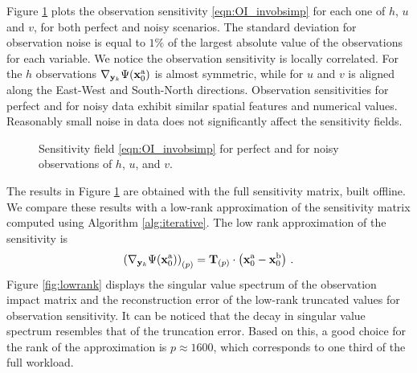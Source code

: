 \documentclass[final,sort&compress]{elsarticle}
\newcommand{\T}{\mathbf{T}}
\newcommand{\xb}{ \mathbf{x}^{\rm b} }
\newcommand{\xa}{ \mathbf{x}^{\rm a} }
\newcommand{\y}{ \mathbf{y} }
\begin{document}
Figure \ref{fig:OI_perfvspert} plots the observation sensitivity \eqref{eqn:OI_invobsimp} for each one of $h$, $u$ and $v$, for both perfect and noisy scenarios.
The standard deviation for observation noise is equal to $1\%$ of the largest absolute value of the observations for each variable. 
We notice the observation sensitivity is locally correlated. 
For the $h$ observations $\nabla_{\y_k} \Psi(\xa_0)$ is almost symmetric, while for $u$ and $v$ is aligned along the East-West and South-North directions. 
Observation sensitivities for perfect and for noisy data exhibit similar spatial features and numerical values.
Reasonably small noise in data does not significantly affect the sensitivity fields.

\begin{figure}
\setcounter{subfigure}{0}
\centering
\caption{Sensitivity field \eqref{eqn:OI_invobsimp} for perfect and for noisy observations of $h$, $u$, and $v$.}
 \label{fig:OI_perfvspert}
\end{figure}

The results in Figure \ref{fig:OI_perfvspert} are obtained with the full sensitivity matrix, built offline.
We compare these results with a low-rank approximation of the sensitivity matrix 
computed using Algorithm \ref{alg:iterative}. The low rank approximation of the sensitivity is
\begin{align}
 \left( \nabla_{\y_k} \Psi(\xa_0) \right)_{(p)} = \T_{(p)} \cdot \left( \xa_0 - \xb_0 \right)\,.
 \label{eqn:OI_invobsimplowrank}
\end{align}
Figure \ref{fig:lowrank} displays the singular value spectrum of the observation impact matrix
and the reconstruction error of the low-rank truncated values for observation sensitivity.
It can be noticed that the decay in singular value spectrum resembles that of the truncation error.
Based on this, a good choice for the rank of the approximation is $p \approx 1600$,
which corresponds to one third of the full workload.
\end{document}
